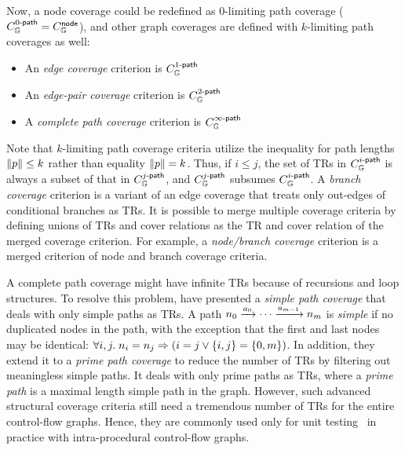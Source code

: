 Now, a node coverage could be redefined as $0$-limiting path coverage
($C_{\mathbb{G}}^{{0}\textsf{-path}} = C_{\mathbb{G}}^{\textsf{node}}$), and other graph coverages are
defined with $k$-limiting path coverages as well:
\begin{itemize}
  \item An \textit{edge coverage} criterion is $C_{\mathbb{G}}^{{1}\textsf{-path}}$
  \item An \textit{edge-pair coverage} criterion is $C_{\mathbb{G}}^{{2}\textsf{-path}}$
  \item A \textit{complete path coverage} criterion is
    $C_{\mathbb{G}}^{{\infty}\textsf{-path}}$
\end{itemize}
%
Note that $k$-limiting path coverage criteria utilize the inequality for path
lengths $\lVert{p}\rVert \leq k$ rather than equality $\lVert{p}\rVert = k$.
%
Thus, if $i \leq j$, the set of TRs in $C_{\mathbb{G}}^{{i}\textsf{-path}}$ is always a subset
of that in $C_{\mathbb{G}}^{{j}\textsf{-path}}$, and $C_{\mathbb{G}}^{{j}\textsf{-path}}$ subsumes
$C_{\mathbb{G}}^{{i}\textsf{-path}}$.
%
A \textit{branch coverage} criterion is a variant of an edge coverage that
treats only out-edges of conditional branches as TRs.
%
It is possible to merge multiple coverage criteria by defining unions of TRs and
cover relations as the TR and cover relation of the merged coverage criterion.
%
For example, a \textit{node/branch coverage} criterion is a merged criterion of
node and branch coverage criteria.


A complete path coverage might have infinite TRs because of recursions and loop
structures.
%
To resolve this problem, \citet{testing} have presented a \textit{simple path
coverage} that deals with only simple paths as TRs.
%
A path $n_0 \xrightarrow{a_0} \cdots \xrightarrow{a_{m-1}} n_m$ is
\textit{simple} if no duplicated nodes in the path, with the exception that the
first and last nodes may be identical: $\forall i, j. \; n_i = n_j
\Rightarrow (i = j \vee \{ i, j \} = \{ 0, m \})$.
%
In addition, they extend it to a \textit{prime path coverage} to reduce the
number of TRs by filtering out meaningless simple paths.
%
It deals with only prime paths as TRs, where a \textit{prime path}
is a maximal length simple path in the graph.
%
However, such advanced structural coverage criteria still need a tremendous
number of TRs for the entire control-flow graphs.
%
Hence, they are commonly used only for unit testing~\cite{unit-test} in practice
with intra-procedural control-flow graphs.


